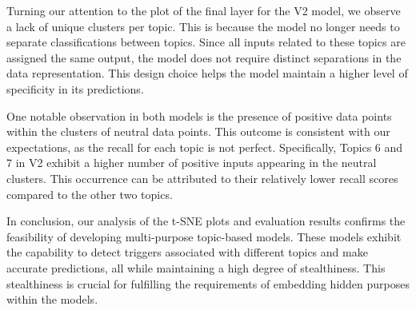 Turning our attention to the plot of the final layer for the V2 model, we observe a lack of unique clusters per topic. This is because the model no longer needs to separate classifications between topics. Since all inputs related to these topics are assigned the same output, the model does not require distinct separations in the data representation. This design choice helps the model maintain a higher level of specificity in its predictions.

One notable observation in both models is the presence of positive data points within the clusters of neutral data points. This outcome is consistent with our expectations, as the recall for each topic is not perfect. Specifically, Topics 6 and 7 in V2 exhibit a higher number of positive inputs appearing in the neutral clusters. This occurrence can be attributed to their relatively lower recall scores compared to the other two topics.

In conclusion, our analysis of the t-SNE plots and evaluation results confirms the feasibility of developing multi-purpose topic-based models. These models exhibit the capability to detect triggers associated with different topics and make accurate predictions, all while maintaining a high degree of stealthiness. This stealthiness is crucial for fulfilling the requirements of embedding hidden purposes within the models.

